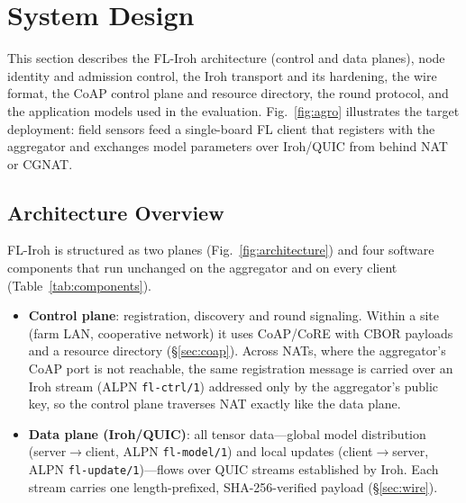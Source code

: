 \section{System Design}
\label{sec:system}

This section describes the FL-Iroh architecture (control and data planes), node identity and admission control, the Iroh transport and its hardening, the wire format, the CoAP control plane and resource directory, the round protocol, and the application models used in the evaluation. Fig.~\ref{fig:agro} illustrates the target deployment: field sensors feed a single-board FL client that registers with the aggregator and exchanges model parameters over Iroh/QUIC from behind NAT or CGNAT.

\subsection{Architecture Overview}

FL-Iroh is structured as two planes (Fig.~\ref{fig:architecture}) and four software components that run unchanged on the aggregator and on every client (Table~\ref{tab:components}).

\begin{itemize}
    \item \textbf{Control plane}: registration, discovery and round signaling. Within a site (farm LAN, cooperative network) it uses CoAP/CoRE with CBOR payloads and a resource directory (\S\ref{sec:coap}). Across NATs, where the aggregator's CoAP port is not reachable, the same registration message is carried over an Iroh stream (ALPN \texttt{fl-ctrl/1}) addressed only by the aggregator's public key, so the control plane traverses NAT exactly like the data plane.
    \item \textbf{Data plane (Iroh/QUIC)}: all tensor data---global model distribution (server$\to$client, ALPN \texttt{fl-model/1}) and local updates (client$\to$server, ALPN \texttt{fl-update/1})---flows over QUIC streams established by Iroh. Each stream carries one length-prefixed, SHA-256-verified payload (\S\ref{sec:wire}).
\end{itemize}

